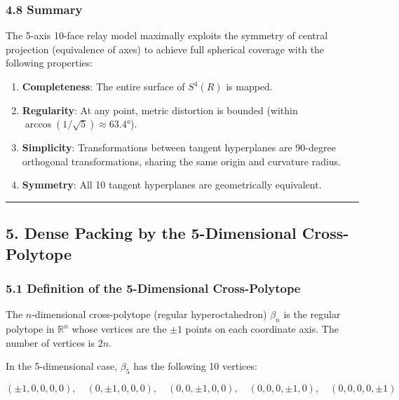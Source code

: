 \documentclass[a4paper,11pt]{article}
\providecommand{\tightlist}{\setlength{\itemsep}{0pt}\setlength{\parskip}{0pt}}
\begin{document}
\subsubsection{4.8 Summary}\label{summary}

The 5-axis 10-face relay model maximally exploits the symmetry of
central projection (equivalence of axes) to achieve full spherical
coverage with the following properties:

\begin{enumerate}
\def\labelenumi{\arabic{enumi}.}
\tightlist
\item
  \textbf{Completeness}: The entire surface of \(S^4(R)\) is mapped.
\item
  \textbf{Regularity}: At any point, metric distortion is bounded
  (within \(\arccos(1/\sqrt{5}) \approx 63.4°\)).
\item
  \textbf{Simplicity}: Transformations between tangent hyperplanes are
  90-degree orthogonal transformations, sharing the same origin and
  curvature radius.
\item
  \textbf{Symmetry}: All 10 tangent hyperplanes are geometrically
  equivalent.
\end{enumerate}

\begin{center}\rule{0.5\linewidth}{0.5pt}\end{center}

\subsection{5. Dense Packing by the 5-Dimensional
Cross-Polytope}\label{dense-packing-by-the-5-dimensional-cross-polytope}

\subsubsection{5.1 Definition of the 5-Dimensional
Cross-Polytope}\label{definition-of-the-5-dimensional-cross-polytope}

The \(n\)-dimensional cross-polytope (regular hyperoctahedron)
\(\beta_n\) is the regular polytope in \(\mathbb{R}^n\) whose vertices
are the \(\pm 1\) points on each coordinate axis. The number of vertices
is \(2n\).

In the 5-dimensional case, \(\beta_5\) has the following 10 vertices:

\[(\pm 1, 0, 0, 0, 0), \quad (0, \pm 1, 0, 0, 0), \quad (0, 0, \pm 1, 0, 0), \quad (0, 0, 0, \pm 1, 0), \quad (0, 0, 0, 0, \pm 1)\]
\end{document}
